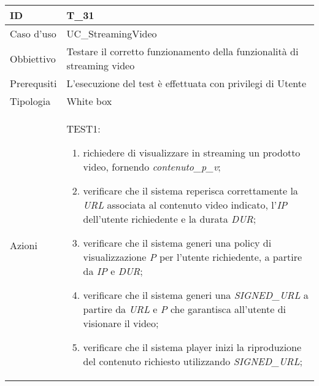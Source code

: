\begin{table}[hb]
    \centering
    \begin{tabular}{ |p{2cm}|p{10cm}|  }
        \hline
        ID          & T\_31                                                                   \\\hline
        Caso d'uso  & UC\_StreamingVideo                                                      \\\hline
        Obbiettivo  & Testare il corretto funzionamento della funzionalità di streaming video \\\hline
        Prerequsiti & L'esecuzione del test è effettuata con privilegi di Utente              \\\hline
        Tipologia   & White box                                                               \\\hline
        Azioni      &
        TEST1:
        \begin{enumerate}[nosep, topsep=0pt]
            \item richiedere di visualizzare in streaming un prodotto video, fornendo \emph{contenuto\_p\_v};
            \item verificare che il sistema reperisca correttamente la \emph{URL} associata al contenuto video indicato, l'\emph{IP} dell'utente richiedente e la durata \emph{DUR};
            \item verificare che il sistema generi una policy di visualizzazione \emph{P} per l'utente richiedente, a partire da \emph{IP} e \emph{DUR};
            \item verificare che il sistema generi una \emph{SIGNED\_URL} a partire da \emph{URL} e \emph{P} che garantisca all'utente di visionare il video;
            \item verificare che il sistema player inizi la riproduzione del contenuto richiesto utilizzando \emph{SIGNED\_URL};
        \end{enumerate}
        \\\hline
    \end{tabular}
\end{table}

